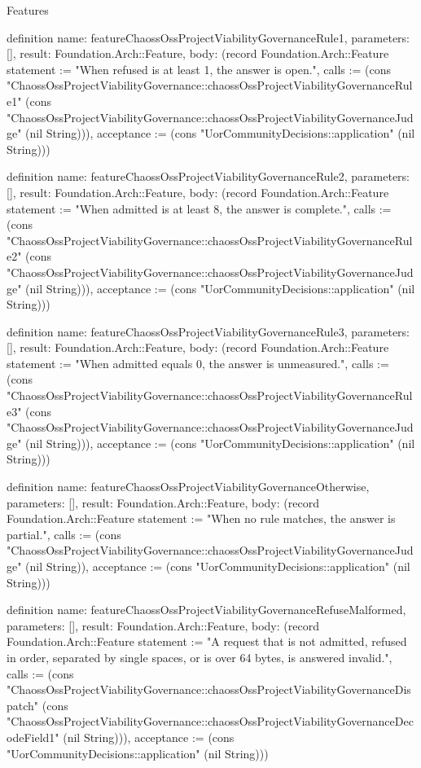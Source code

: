 \begin{lexlean}{Features}
\begin{semanticmodule}
definition{
  name: featureChaossOssProjectViabilityGovernanceRule1,
  parameters: [],
  result: Foundation.Arch::Feature,
  body: (record Foundation.Arch::Feature {statement := "When refused is at least 1, the answer is open.", calls := (cons "ChaossOssProjectViabilityGovernance::chaossOssProjectViabilityGovernanceRule1" (cons "ChaossOssProjectViabilityGovernance::chaossOssProjectViabilityGovernanceJudge" (nil String))), acceptance := (cons "UorCommunityDecisions::application" (nil String))})
}

definition{
  name: featureChaossOssProjectViabilityGovernanceRule2,
  parameters: [],
  result: Foundation.Arch::Feature,
  body: (record Foundation.Arch::Feature {statement := "When admitted is at least 8, the answer is complete.", calls := (cons "ChaossOssProjectViabilityGovernance::chaossOssProjectViabilityGovernanceRule2" (cons "ChaossOssProjectViabilityGovernance::chaossOssProjectViabilityGovernanceJudge" (nil String))), acceptance := (cons "UorCommunityDecisions::application" (nil String))})
}

definition{
  name: featureChaossOssProjectViabilityGovernanceRule3,
  parameters: [],
  result: Foundation.Arch::Feature,
  body: (record Foundation.Arch::Feature {statement := "When admitted equals 0, the answer is unmeasured.", calls := (cons "ChaossOssProjectViabilityGovernance::chaossOssProjectViabilityGovernanceRule3" (cons "ChaossOssProjectViabilityGovernance::chaossOssProjectViabilityGovernanceJudge" (nil String))), acceptance := (cons "UorCommunityDecisions::application" (nil String))})
}

definition{
  name: featureChaossOssProjectViabilityGovernanceOtherwise,
  parameters: [],
  result: Foundation.Arch::Feature,
  body: (record Foundation.Arch::Feature {statement := "When no rule matches, the answer is partial.", calls := (cons "ChaossOssProjectViabilityGovernance::chaossOssProjectViabilityGovernanceJudge" (nil String)), acceptance := (cons "UorCommunityDecisions::application" (nil String))})
}

definition{
  name: featureChaossOssProjectViabilityGovernanceRefuseMalformed,
  parameters: [],
  result: Foundation.Arch::Feature,
  body: (record Foundation.Arch::Feature {statement := "A request that is not admitted, refused in order, separated by single spaces, or is over 64 bytes, is answered invalid.", calls := (cons "ChaossOssProjectViabilityGovernance::chaossOssProjectViabilityGovernanceDispatch" (cons "ChaossOssProjectViabilityGovernance::chaossOssProjectViabilityGovernanceDecodeField1" (nil String))), acceptance := (cons "UorCommunityDecisions::application" (nil String))})
}


\end{semanticmodule}
\end{lexlean}
